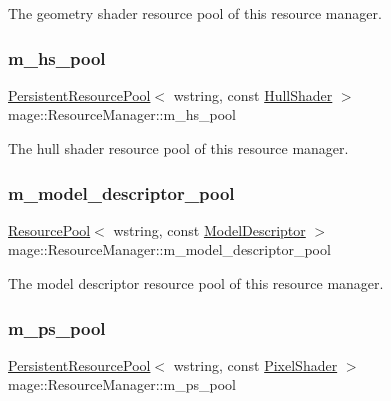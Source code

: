 The geometry shader resource pool of this resource manager. \hypertarget{classmage_1_1_resource_manager_a7eeec15dd7b10202bd9b65de965c3f49}{}\label{classmage_1_1_resource_manager_a7eeec15dd7b10202bd9b65de965c3f49} 
\subsubsection{\texorpdfstring{m\+\_\+hs\+\_\+pool}{m\_hs\_pool}}
{\footnotesize\ttfamily \hyperlink{classmage_1_1_persistent_resource_pool}{Persistent\+Resource\+Pool}$<$ wstring, const \hyperlink{namespacemage_a964e5e384b0e55ac900c819da48b6000}{Hull\+Shader} $>$ mage\+::\+Resource\+Manager\+::m\+\_\+hs\+\_\+pool\hspace{0.3cm}{\ttfamily [private]}}

The hull shader resource pool of this resource manager. \hypertarget{classmage_1_1_resource_manager_af6c13ddf41f4a451a874301e8aa6042f}{}\label{classmage_1_1_resource_manager_af6c13ddf41f4a451a874301e8aa6042f} 
\subsubsection{\texorpdfstring{m\+\_\+model\+\_\+descriptor\+\_\+pool}{m\_model\_descriptor\_pool}}
{\footnotesize\ttfamily \hyperlink{classmage_1_1_resource_pool}{Resource\+Pool}$<$ wstring, const \hyperlink{classmage_1_1_model_descriptor}{Model\+Descriptor} $>$ mage\+::\+Resource\+Manager\+::m\+\_\+model\+\_\+descriptor\+\_\+pool\hspace{0.3cm}{\ttfamily [private]}}

The model descriptor resource pool of this resource manager. \hypertarget{classmage_1_1_resource_manager_a0366e1441cd795c9d05b93d4e0820fca}{}\label{classmage_1_1_resource_manager_a0366e1441cd795c9d05b93d4e0820fca} 
\subsubsection{\texorpdfstring{m\+\_\+ps\+\_\+pool}{m\_ps\_pool}}
{\footnotesize\ttfamily \hyperlink{classmage_1_1_persistent_resource_pool}{Persistent\+Resource\+Pool}$<$ wstring, const \hyperlink{namespacemage_a27ecaf266420ee7a494d64edc0757129}{Pixel\+Shader} $>$ mage\+::\+Resource\+Manager\+::m\+\_\+ps\+\_\+pool\hspace{0.3cm}{\ttfamily [private]}}

